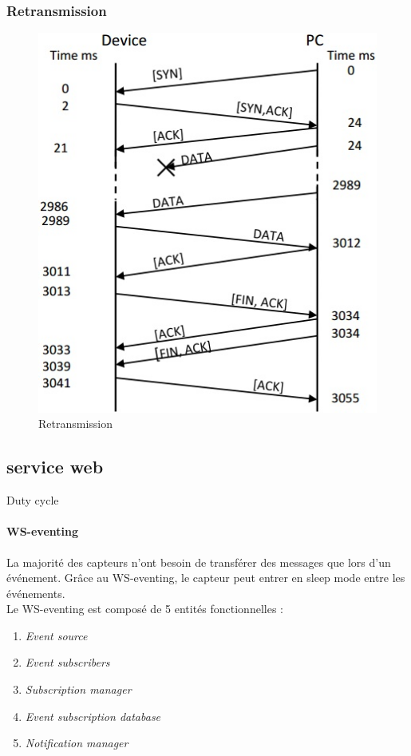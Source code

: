 \begin{frame}
 \frametitle{Retransmission}
 \begin{figure}
  
  \includegraphics[scale=0.5]{figures/TCPretransmission.jpg}
  \caption{Retransmission}
  \label{retransmission}
  
 \end{figure}
\end{frame}

\subsection{service web}
\begin{frame}{Duty cycle}
 \framesubtitle{WS-eventing}
 La majorité des capteurs n'ont besoin de transférer des messages que lors d'un événement. Grâce au WS-eventing, le capteur peut entrer en sleep mode entre les événements.\\
 \vspace{3mm}
 Le WS-eventing est composé de 5 entités fonctionnelles :
 \begin{enumerate}
  \item \textit{Event source} %
  \item \textit{Event subscribers} %
  \item \textit{Subscription manager} %
  \item \textit{Event subscription database} %
  \item \textit{Notification manager} %
 \end{enumerate}
\end{frame}

